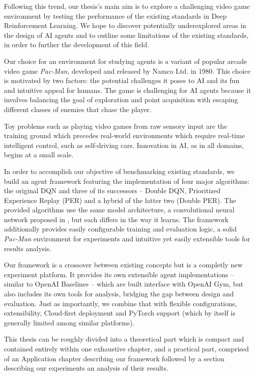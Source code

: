 \documentclass[12pt,twoside]{report}
\begin{document}
Following this trend, our thesis's main aim is to explore a challenging video game environment by testing the performance of the existing standards in Deep Reinforcement Learning.
We hope to discover potentially underexplored areas in the design of AI agents and to outline some limitations of the existing standards, in order to further the development of this field.

Our choice for an environment for studying agents is a variant of popular arcade video game \emph{Pac-Man}, developed and released by Namco Ltd. in 1980.
This choice is motivated by two factors: the potential challenges it poses to AI and its fun and intuitive appeal for humans.
The game is challenging for AI agents because it involves balancing the goal of exploration and point acquisition with escaping different classes of enemies that chase the player.

Toy problems such as playing video games from raw sensory input are the training ground which precedes real-world environments which require real-time intelligent control, such as self-driving cars.
Innovation in AI, as in all domains, begins at a small scale.

In order to accomplish our objective of benchmarking existing standards, we build an agent framework featuring the implementation of four major algorithms: the original DQN and three of its successors -- Double DQN, Prioritized Experience Replay (PER) and a hybrid of the latter two (Double PER).
The provided algorithms use the same model architecture, a convolutional neural network proposed in \cite{atari-dqn}, but each differs in the way it learns.
The framework additionally provides easily configurable training and evaluation logic, a solid \emph{Pac-Man} environment for experiments and intuitive yet easily extensible tools for results analysis.

Our framework is a crossover between existing concepts but is a completly new experiment platform.
It provides its own extensible agent implementations -- similar to OpenAI Baselines -- which are built interface with OpenAI Gym, but also includes its own tools for analysis, bridging the gap between design and evaluation.
Just as importantly, we combine that with flexible configurations, extensibility, Cloud-first deployment and PyTorch support (which by itself is generally limited among similar platforms).

This thesis can be roughly divided into a theoretical part which is compact and contained entirely within one exhaustive chapter, and a practical part, comprised of an Application chapter describing our framework followed by a section describing our experiments an analysis of their results.
\end{document}
